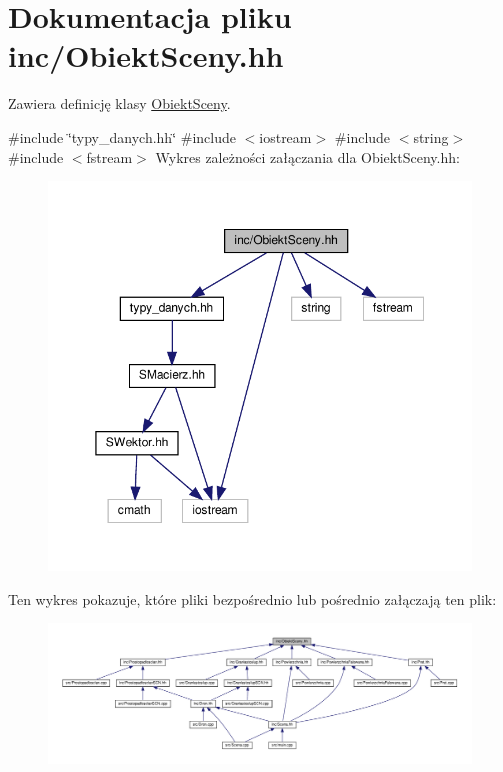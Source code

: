 \hypertarget{ObiektSceny_8hh}{}\section{Dokumentacja pliku inc/\+Obiekt\+Sceny.hh}
\label{ObiektSceny_8hh}


Zawiera definicję klasy \hyperlink{classObiektSceny}{Obiekt\+Sceny}.  


{\ttfamily \#include \char`\"{}typy\+\_\+danych.\+hh\char`\"{}}\newline
{\ttfamily \#include $<$iostream$>$}\newline
{\ttfamily \#include $<$string$>$}\newline
{\ttfamily \#include $<$fstream$>$}\newline
Wykres zależności załączania dla Obiekt\+Sceny.\+hh\+:\nopagebreak
\begin{figure}[H]
\begin{center}
\leavevmode
\includegraphics[width=350pt]{ObiektSceny_8hh__incl}
\end{center}
\end{figure}
Ten wykres pokazuje, które pliki bezpośrednio lub pośrednio załączają ten plik\+:\nopagebreak
\begin{figure}[H]
\begin{center}
\leavevmode
\includegraphics[width=350pt]{ObiektSceny_8hh__dep__incl}
\end{center}
\end{figure}
